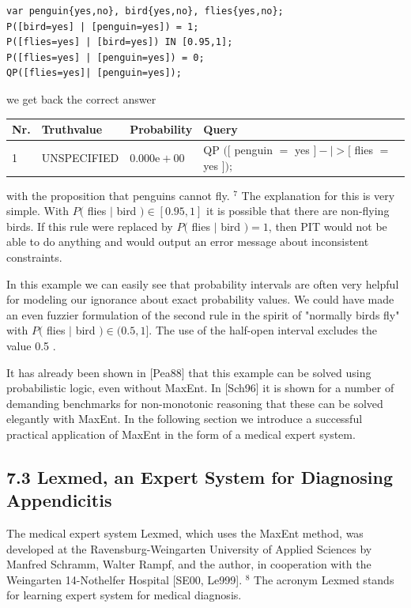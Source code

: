 \documentclass[10pt]{article}
\begin{document}
\begin{verbatim}
var penguin{yes,no}, bird{yes,no}, flies{yes,no};
P([bird=yes] | [penguin=yes]) = 1;
P([flies=yes] | [bird=yes]) IN [0.95,1];
P([flies=yes] | [penguin=yes]) = 0;
QP([flies=yes]| [penguin=yes]);
\end{verbatim}

we get back the correct answer

\begin{center}
\begin{tabular}{llll}
\hline
Nr. & Truthvalue & Probability & Query \\
\hline
1 & UNSPECIFIED & $0.000 \mathrm{e}+00$ & QP $([$ penguin $=$ yes $]-\mid>[$ flies $=$ yes $]) ;$ \\
\hline
\end{tabular}
\end{center}

with the proposition that penguins cannot fly. ${ }^{7}$ The explanation for this is very simple. With $P($ flies $\mid$ bird $) \in[0.95,1]$ it is possible that there are non-flying birds. If this rule were replaced by $P($ flies $\mid$ bird $)=1$, then PIT would not be able to do anything and would output an error message about inconsistent constraints.

In this example we can easily see that probability intervals are often very helpful for modeling our ignorance about exact probability values. We could have made an even fuzzier formulation of the second rule in the spirit of "normally birds fly" with $P($ flies $\mid$ bird $) \in(0.5,1]$. The use of the half-open interval excludes the value 0.5 .

It has already been shown in [Pea88] that this example can be solved using probabilistic logic, even without MaxEnt. In [Sch96] it is shown for a number of demanding benchmarks for non-monotonic reasoning that these can be solved elegantly with MaxEnt. In the following section we introduce a successful practical application of MaxEnt in the form of a medical expert system.

\subsection*{7.3 Lexmed, an Expert System for Diagnosing Appendicitis}
The medical expert system Lexmed, which uses the MaxEnt method, was developed at the Ravensburg-Weingarten University of Applied Sciences by Manfred Schramm, Walter Rampf, and the author, in cooperation with the Weingarten 14-Nothelfer Hospital [SE00, Le999]. ${ }^{8}$ The acronym Lexmed stands for learning expert system for medical diagnosis.
\end{document}
